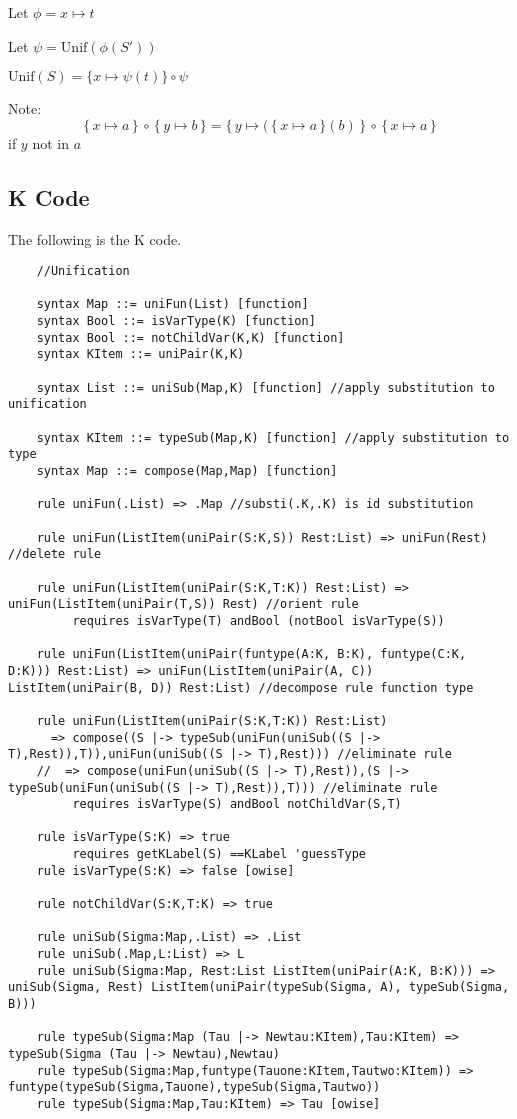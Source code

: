Let $\phi = x \mapsto t$

Let $\psi = \text{Unif}(\phi(S'))$

$\text{Unif}(S) = \{x \mapsto \psi(t) \} \circ \psi$

Note: $$\{\, x \mapsto a \, \} \, \circ \, \{ \, y \mapsto b\,\} =
\{ \, y \mapsto (\,\{ \, x \mapsto a \, \} (b) \, \} \, \circ \, \{ \, x \mapsto a \, \}$$ if $y$ not
in $a$

\cite{CS421:Unif}

\subsection{K Code}

The following is the K code.
\begin{lstlisting}
    //Unification

    syntax Map ::= uniFun(List) [function]
    syntax Bool ::= isVarType(K) [function]
    syntax Bool ::= notChildVar(K,K) [function]
    syntax KItem ::= uniPair(K,K)

    syntax List ::= uniSub(Map,K) [function] //apply substitution to unification

    syntax KItem ::= typeSub(Map,K) [function] //apply substitution to type
    syntax Map ::= compose(Map,Map) [function]

    rule uniFun(.List) => .Map //substi(.K,.K) is id substitution

    rule uniFun(ListItem(uniPair(S:K,S)) Rest:List) => uniFun(Rest)  //delete rule

    rule uniFun(ListItem(uniPair(S:K,T:K)) Rest:List) => uniFun(ListItem(uniPair(T,S)) Rest) //orient rule
         requires isVarType(T) andBool (notBool isVarType(S))

    rule uniFun(ListItem(uniPair(funtype(A:K, B:K), funtype(C:K, D:K))) Rest:List) => uniFun(ListItem(uniPair(A, C)) ListItem(uniPair(B, D)) Rest:List) //decompose rule function type

    rule uniFun(ListItem(uniPair(S:K,T:K)) Rest:List) 
      => compose((S |-> typeSub(uniFun(uniSub((S |-> T),Rest)),T)),uniFun(uniSub((S |-> T),Rest))) //eliminate rule
    //  => compose(uniFun(uniSub((S |-> T),Rest)),(S |-> typeSub(uniFun(uniSub((S |-> T),Rest)),T))) //eliminate rule
         requires isVarType(S) andBool notChildVar(S,T)

    rule isVarType(S:K) => true
         requires getKLabel(S) ==KLabel 'guessType
    rule isVarType(S:K) => false [owise]

    rule notChildVar(S:K,T:K) => true

    rule uniSub(Sigma:Map,.List) => .List
    rule uniSub(.Map,L:List) => L
    rule uniSub(Sigma:Map, Rest:List ListItem(uniPair(A:K, B:K))) => uniSub(Sigma, Rest) ListItem(uniPair(typeSub(Sigma, A), typeSub(Sigma, B)))

    rule typeSub(Sigma:Map (Tau |-> Newtau:KItem),Tau:KItem) => typeSub(Sigma (Tau |-> Newtau),Newtau)
    rule typeSub(Sigma:Map,funtype(Tauone:KItem,Tautwo:KItem)) => funtype(typeSub(Sigma,Tauone),typeSub(Sigma,Tautwo))
    rule typeSub(Sigma:Map,Tau:KItem) => Tau [owise]
\end{lstlisting}
